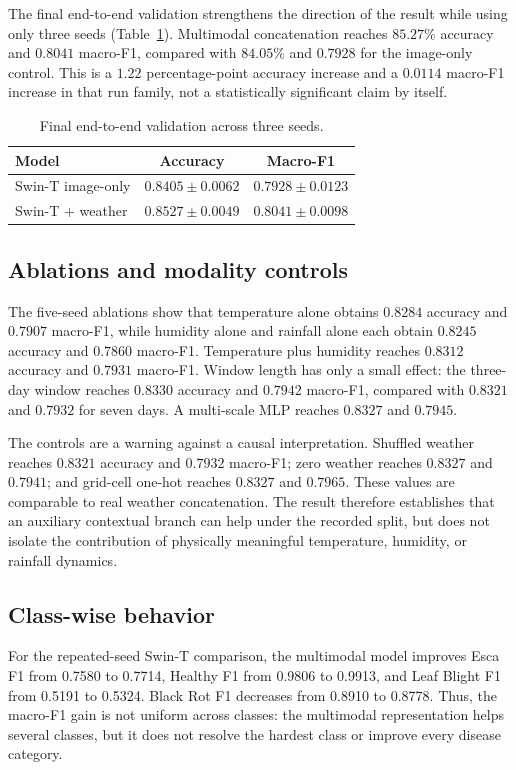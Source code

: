 \documentclass[conference]{IEEEtran}
\begin{document}
The final end-to-end validation strengthens the direction of the result while using only three seeds (Table~\ref{tab:final}). Multimodal concatenation reaches $85.27\%$ accuracy and $0.8041$ macro-F1, compared with $84.05\%$ and $0.7928$ for the image-only control. This is a $1.22$ percentage-point accuracy increase and a $0.0114$ macro-F1 increase in that run family, not a statistically significant claim by itself.

\begin{table}[t]
\centering
\caption{Final end-to-end validation across three seeds.}
\label{tab:final}
\scriptsize
\begin{tabular}{lcc}
\toprule
Model & Accuracy & Macro-F1\\
\midrule
Swin-T image-only & $0.8405\pm0.0062$ & $0.7928\pm0.0123$\\
Swin-T + weather & $\mathbf{0.8527\pm0.0049}$ & $\mathbf{0.8041\pm0.0098}$\\
\bottomrule
\end{tabular}
\end{table}

\subsection{Ablations and modality controls}
The five-seed ablations show that temperature alone obtains $0.8284$ accuracy and $0.7907$ macro-F1, while humidity alone and rainfall alone each obtain $0.8245$ accuracy and $0.7860$ macro-F1. Temperature plus humidity reaches $0.8312$ accuracy and $0.7931$ macro-F1. Window length has only a small effect: the three-day window reaches $0.8330$ accuracy and $0.7942$ macro-F1, compared with $0.8321$ and $0.7932$ for seven days. A multi-scale MLP reaches $0.8327$ and $0.7945$.

The controls are a warning against a causal interpretation. Shuffled weather reaches $0.8321$ accuracy and $0.7932$ macro-F1; zero weather reaches $0.8327$ and $0.7941$; and grid-cell one-hot reaches $0.8327$ and $0.7965$. These values are comparable to real weather concatenation. The result therefore establishes that an auxiliary contextual branch can help under the recorded split, but does not isolate the contribution of physically meaningful temperature, humidity, or rainfall dynamics.

\subsection{Class-wise behavior}
For the repeated-seed Swin-T comparison, the multimodal model improves Esca F1 from 0.7580 to 0.7714, Healthy F1 from 0.9806 to 0.9913, and Leaf Blight F1 from 0.5191 to 0.5324. Black Rot F1 decreases from 0.8910 to 0.8778. Thus, the macro-F1 gain is not uniform across classes: the multimodal representation helps several classes, but it does not resolve the hardest class or improve every disease category.
\end{document}
